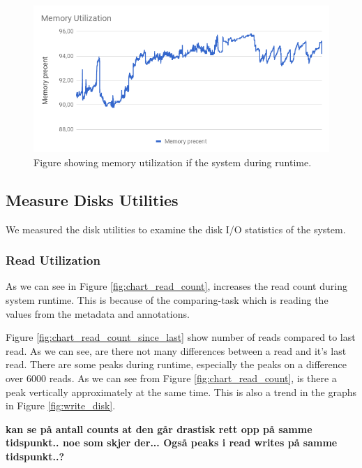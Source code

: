 \documentclass[USenglish]{uit-thesis}
\begin{document}
\begin{figure}
\centering
\includegraphics[width=\textwidth]{chart_memory.png}
\caption{Figure showing memory utilization if the system during runtime.}
\label{fig:chart_memory}
\end{figure}


\subsection{Measure Disks Utilities} \label{sec:eva_disks}
We measured the disk utilities to examine the disk I/O statistics of the system.

\subsubsection{Read Utilization}
As we can see in Figure \ref{fig:chart_read_count}, increases the read count during system runtime. This is because of the comparing-task which is reading the values from the metadata and annotations.


Figure \ref{fig:chart_read_count_since_last} show number of reads compared to last read. As we can see, are there not many differences between a read and it's last read. There are some peaks during runtime, especially the peaks on a difference over 6000 reads. As we can see from Figure \ref{fig:chart_read_count}, is there a peak vertically approximately at the same time. This is also a trend in the graphs in Figure \ref{fig:write_disk}.

\textbf{kan se på antall counts at den går drastisk rett opp på samme tidspunkt.. noe som skjer der... Også peaks i read writes på samme tidspunkt..?}
\end{document}
